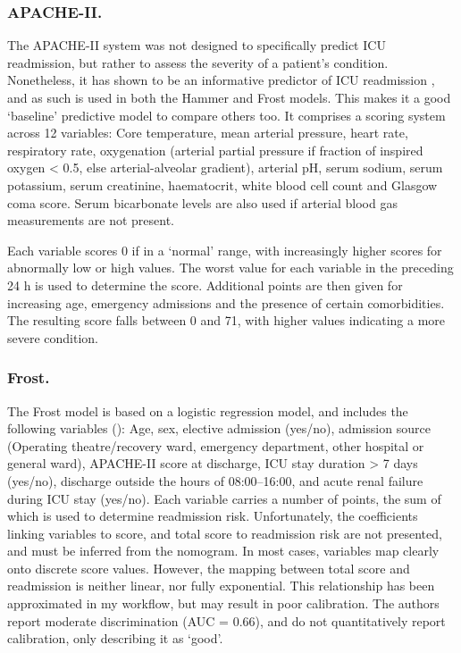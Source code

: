 \documentclass[onecolumn]{article}
\begin{document}
\subsubsection*{APACHE-II.}

The APACHE-II system was not designed to specifically predict ICU readmission, but rather to assess the severity of a patient's condition. Nonetheless, it has shown to be an informative predictor of ICU readmission \citep{Campbell2008}, and as such is used in both the Hammer and Frost models. This makes it a good `baseline' predictive model to compare others too. It comprises a scoring system across 12 variables: Core temperature, mean arterial pressure, heart rate, respiratory rate, oxygenation (arterial partial pressure if fraction of inspired oxygen < 0.5, else arterial-alveolar gradient), arterial pH, serum sodium, serum potassium, serum creatinine, haematocrit, white blood cell count and Glasgow coma score. Serum bicarbonate levels are also used if arterial blood gas measurements are not present.

Each variable scores 0 if in a `normal' range, with increasingly higher scores for abnormally low or high values. The worst value for each variable in the preceding 24 h is used to determine the score. Additional points are then given for increasing age, emergency admissions and the presence of certain comorbidities. The resulting score falls between 0 and 71, with higher values indicating a more severe condition.


\subsubsection*{Frost.} 

The Frost model is based on a logistic regression model, and includes the following variables (): Age, sex, elective admission (yes/no), admission source (Operating theatre/recovery ward, emergency department, other hospital or general ward), APACHE-II score at discharge, ICU stay duration > 7 days (yes/no), discharge outside the hours of 08:00--16:00, and acute renal failure during ICU stay (yes/no). Each variable carries a number of points, the sum of which is used to determine readmission risk. Unfortunately, the coefficients linking variables to score, and total score to readmission risk are not presented, and must be inferred from the nomogram. In most cases, variables map clearly onto discrete score values. However, the mapping between total score and readmission is neither linear, nor fully exponential. This relationship has been approximated in my workflow, but may result in poor calibration. The authors report moderate discrimination (AUC = 0.66), and do not quantitatively report calibration, only describing it as `good'.
\end{document}
